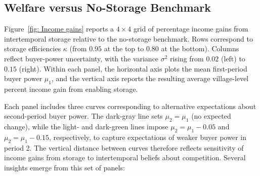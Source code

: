 \subsection{Welfare versus No-Storage Benchmark}
\noindent 
Figure~\ref{fig: Income gains} reports a $4\times4$ grid of percentage income gains from intertemporal storage relative to the no-storage benchmark. Rows correspond to storage efficiencies $\kappa$ (from $0.95$ at the top to $0.80$ at the bottom). Columns reflect buyer-power uncertainty, with the variance $\sigma^2$ rising from $0.02$ (left) to $0.15$ (right). Within each panel, the horizontal axis plots the mean first-period buyer power $\mu_1$, and the vertical axis reports the resulting average village-level percent income gain from enabling storage.

Each panel includes three curves corresponding to alternative expectations about second-period buyer power. The dark-gray line sets $\mu_2=\mu_1$ (no expected change), while the light- and dark-green lines impose $\mu_2=\mu_1-0.05$ and $\mu_2=\mu_1-0.15$, respectively, to capture expectations of weaker buyer power in period 2. The vertical distance between curves therefore reflects sensitivity of income gains from storage to intertemporal beliefs about competition. Several insights emerge from this set of panels:

